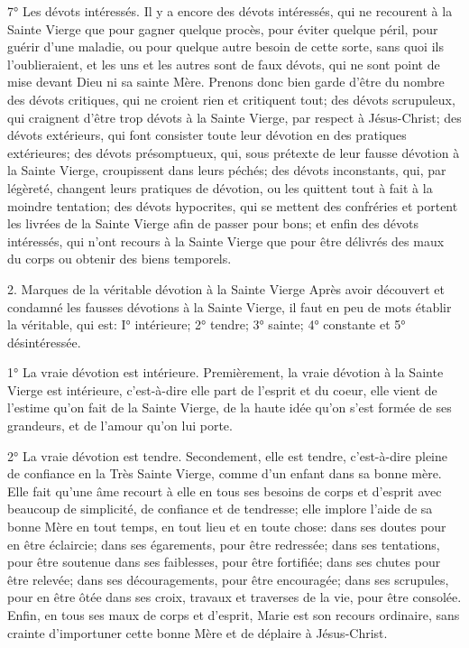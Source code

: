 7° Les dévots intéressés.
 Il y a encore des dévots intéressés, qui ne recourent à la Sainte Vierge que pour gagner quelque procès,
pour éviter quelque péril, pour guérir d'une maladie, ou pour quelque autre besoin de cette sorte, sans quoi ils
l'oublieraient, et les uns et les autres sont de faux dévots, qui ne sont point de mise devant Dieu ni sa sainte Mère.
 Prenons donc bien garde d'être du nombre des dévots critiques, qui ne croient rien et critiquent tout; des
dévots scrupuleux, qui craignent d'être trop dévots à la Sainte Vierge, par respect à Jésus-Christ; des dévots
extérieurs, qui font consister toute leur dévotion en des pratiques extérieures; des dévots présomptueux, qui, sous
prétexte de leur fausse dévotion à la Sainte Vierge, croupissent dans leurs péchés; des dévots inconstants, qui,
par légèreté, changent leurs pratiques de dévotion, ou les quittent tout à fait à la moindre tentation; des dévots
hypocrites, qui se mettent des confréries et portent les livrées de la Sainte Vierge afin de passer pour bons; et
enfin des dévots intéressés, qui n'ont recours à la Sainte Vierge que pour être délivrés des maux du corps ou
obtenir des biens temporels.

2. Marques de la véritable dévotion à la Sainte Vierge
 Après avoir découvert et condamné les fausses dévotions à la Sainte Vierge, il faut en peu de mots établir la
véritable, qui est: I° intérieure; 2° tendre; 3° sainte; 4° constante et 5° désintéressée.

1° La vraie dévotion est intérieure.
 Premièrement, la vraie dévotion à la Sainte Vierge est intérieure, c'est-à-dire elle part de l'esprit et du coeur,
elle vient de l'estime qu'on fait de la Sainte Vierge, de la haute idée qu'on s'est formée de ses grandeurs, et de
l'amour qu'on lui porte.

2° La vraie dévotion est tendre.
 Secondement, elle est tendre, c'est-à-dire pleine de confiance en la Très Sainte Vierge, comme d'un enfant
dans sa bonne mère. Elle fait qu'une âme recourt à elle en tous ses besoins de corps et d'esprit avec beaucoup de
simplicité, de confiance et de tendresse; elle implore l'aide de sa bonne Mère en tout temps, en tout lieu et en toute
chose: dans ses doutes pour en être éclaircie; dans ses égarements, pour être redressée; dans ses tentations,
pour être soutenue dans ses faiblesses, pour être fortifiée; dans ses chutes pour être relevée; dans ses
découragements, pour être encouragée; dans ses scrupules, pour en être ôtée dans ses croix, travaux et traverses
de la vie, pour être consolée. Enfin, en tous ses maux de corps et d'esprit, Marie est son recours ordinaire, sans
crainte d'importuner cette bonne Mère et de déplaire à Jésus-Christ.

